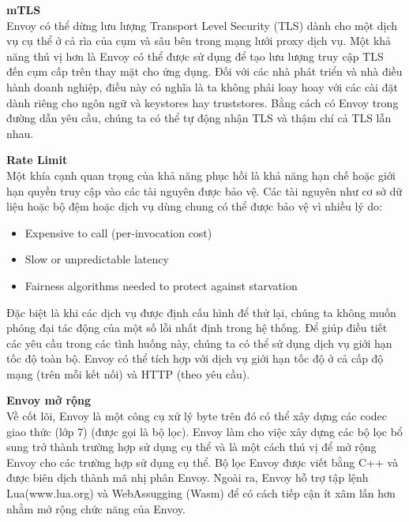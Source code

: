 \documentclass[12pt,a4paper]{report}
\begin{document}
		\textbf{mTLS}\\
		Envoy có thể dừng lưu lượng Transport Level Security (TLS) dành cho một dịch vụ cụ thể ở cả rìa của cụm và sâu bên trong mạng lưới proxy dịch vụ. Một khả năng thú vị hơn là Envoy có thể được sử dụng để tạo lưu lượng truy cập TLS đến cụm cấp trên thay mặt cho ứng dụng. Đối với các nhà phát triển và nhà điều hành doanh nghiệp, điều này có nghĩa là ta không phải loay hoay với các cài đặt dành riêng cho ngôn ngữ và keystores hay truststores. Bằng cách có Envoy trong đường dẫn yêu cầu, chúng ta có thể tự động nhận TLS và thậm chí cả TLS lẫn nhau.
		
		\textbf{Rate Limit}\\
		Một khía cạnh quan trọng của khả năng phục hồi là khả năng hạn chế hoặc giới hạn quyền truy cập vào các tài nguyên được bảo vệ. Các tài nguyên như cơ sở dữ liệu hoặc bộ đệm hoặc dịch vụ dùng chung có thể được bảo vệ vì nhiều lý do:
		\begin{itemize}
			\item Expensive to call (per-invocation cost)
			\item Slow or unpredictable latency
			\item Fairness algorithms needed to protect against starvation
		\end{itemize}
		
		Đặc biệt là khi các dịch vụ được định cấu hình để thử lại, chúng ta không muốn phóng đại tác động của một số lỗi nhất định trong hệ thống. Để giúp điều tiết các yêu cầu trong các tình huống này, chúng ta có thể sử dụng dịch vụ giới hạn tốc độ toàn bộ. Envoy có thể tích hợp với dịch vụ giới hạn tốc độ ở cả cấp độ mạng (trên mỗi kết nối) và HTTP (theo yêu cầu).
		
		\textbf{Envoy mở rộng}\\
		Về cốt lõi, Envoy là một công cụ xử lý byte trên đó có thể xây dựng các codec giao thức (lớp 7) (được gọi là bộ lọc). Envoy làm cho việc xây dựng các bộ lọc bổ sung trở thành trường hợp sử dụng cụ thể và là một cách thú vị để mở rộng Envoy cho các trường hợp sử dụng cụ thể. Bộ lọc Envoy được viết bằng C++ và được biên dịch thành mã nhị phân Envoy. Ngoài ra, Envoy hỗ trợ tập lệnh Lua(www.lua.org) và WebAssugging (Wasm) để có cách tiếp cận ít xâm lấn hơn nhằm mở rộng chức năng của Envoy.
		
\end{document}
